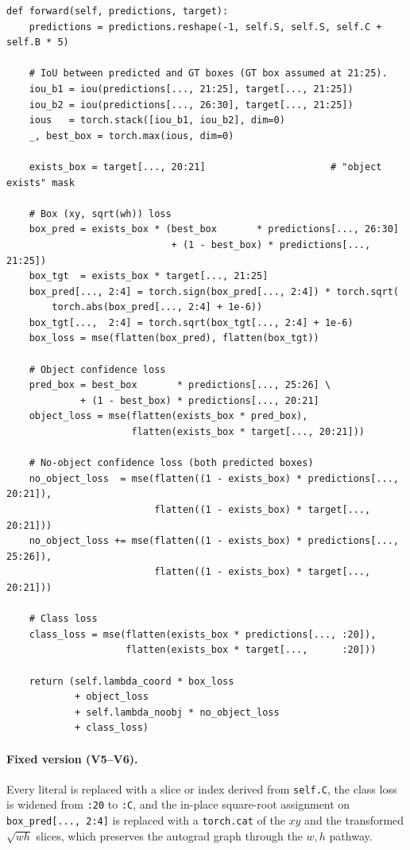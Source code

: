 \begin{lstlisting}[caption={Buggy body of \texttt{YoloLoss.forward}.},
label=lst:loss-buggy]
def forward(self, predictions, target):
    predictions = predictions.reshape(-1, self.S, self.S, self.C + self.B * 5)

    # IoU between predicted and GT boxes (GT box assumed at 21:25).
    iou_b1 = iou(predictions[..., 21:25], target[..., 21:25])
    iou_b2 = iou(predictions[..., 26:30], target[..., 21:25])
    ious   = torch.stack([iou_b1, iou_b2], dim=0)
    _, best_box = torch.max(ious, dim=0)

    exists_box = target[..., 20:21]                      # "object exists" mask

    # Box (xy, sqrt(wh)) loss
    box_pred = exists_box * (best_box       * predictions[..., 26:30]
                             + (1 - best_box) * predictions[..., 21:25])
    box_tgt  = exists_box * target[..., 21:25]
    box_pred[..., 2:4] = torch.sign(box_pred[..., 2:4]) * torch.sqrt(
        torch.abs(box_pred[..., 2:4] + 1e-6))
    box_tgt[...,  2:4] = torch.sqrt(box_tgt[..., 2:4] + 1e-6)
    box_loss = mse(flatten(box_pred), flatten(box_tgt))

    # Object confidence loss
    pred_box = best_box       * predictions[..., 25:26] \
             + (1 - best_box) * predictions[..., 20:21]
    object_loss = mse(flatten(exists_box * pred_box),
                      flatten(exists_box * target[..., 20:21]))

    # No-object confidence loss (both predicted boxes)
    no_object_loss  = mse(flatten((1 - exists_box) * predictions[..., 20:21]),
                          flatten((1 - exists_box) * target[..., 20:21]))
    no_object_loss += mse(flatten((1 - exists_box) * predictions[..., 25:26]),
                          flatten((1 - exists_box) * target[..., 20:21]))

    # Class loss
    class_loss = mse(flatten(exists_box * predictions[..., :20]),
                     flatten(exists_box * target[...,      :20]))

    return (self.lambda_coord * box_loss
            + object_loss
            + self.lambda_noobj * no_object_loss
            + class_loss)
\end{lstlisting}

\paragraph{Fixed version (V5--V6).} Every literal is replaced with a slice
or index derived from \texttt{self.C}, the class loss is widened from
\texttt{:20} to \texttt{:C}, and the in-place square-root assignment on
\texttt{box\_pred[..., 2:4]} is replaced with a \texttt{torch.cat} of the
$xy$ and the transformed $\sqrt{wh}$ slices, which preserves the autograd
graph through the $w, h$ pathway.

